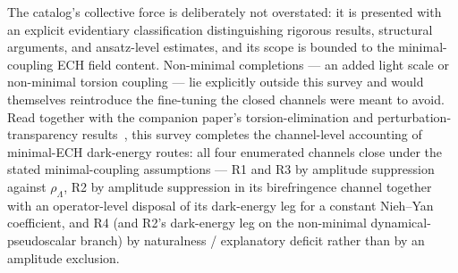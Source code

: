 \documentclass[aps,prd,twocolumn,superscriptaddress,showpacs,preprintnumbers,nofootinbib,longbibliography,floatfix]{revtex4-2}
\begin{document}
The catalog's collective force is deliberately not overstated: it is
presented with an explicit evidentiary classification distinguishing
rigorous results, structural arguments, and ansatz-level estimates, and its
scope is bounded to the minimal-coupling ECH field content. Non-minimal
completions --- an added light scale or non-minimal torsion coupling --- lie
explicitly outside this survey and would themselves reintroduce the
fine-tuning the closed channels were meant to avoid. Read together with the
companion paper's torsion-elimination and perturbation-transparency
results~\cite{Golden2026P1a}, this survey completes the channel-level
accounting of minimal-ECH dark-energy routes: all four enumerated channels
close under the stated minimal-coupling assumptions --- R1 and R3 by
amplitude suppression against $\rho_\Lambda$, R2 by amplitude suppression
in its birefringence channel together with an operator-level disposal of
its dark-energy leg for a constant Nieh--Yan coefficient, and R4 (and
R2's dark-energy leg on the non-minimal dynamical-pseudoscalar branch) by
naturalness / explanatory deficit rather than by an amplitude exclusion.
\end{document}
